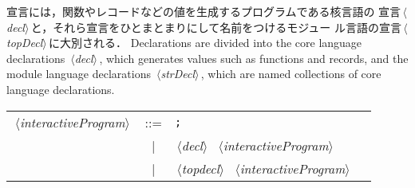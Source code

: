 \documentclass{jbook}
\newcommand{\vbar}{\mbox{\ $|$\ }}
\newcommand{\nonterm}[1]{\mbox{$\,\langle$}{\it #1}\mbox{$\rangle\,$}}
\newcommand{\term}[1]{\mbox{{\tt #1}}}
\begin{document}
\ifjp%
	宣言には，関数やレコードなどの値を生成するプログラムである核言語の
宣言\nonterm{decl}と，それら宣言をひとまとまりにして名前をつけるモジュー
ル言語の宣言\nonterm{topDecl}に大別される．
\else%
	Declarations are divided into the core language declarations
\nonterm{decl}, which generates values such as functions and records,
and the module language declarations \nonterm{strDecl}, which are named
collections of core language declarations.
\fi%

\begin{center}
\begin{tabular}{lcll}
\nonterm{interactiveProgram} &::=& \term{;}
\\
&\vbar&  \nonterm{decl}\ \nonterm{interactiveProgram}
\\
&\vbar&  \nonterm{topdecl}\ \nonterm{interactiveProgram}
\end{tabular}
\end{center}
\end{document}
